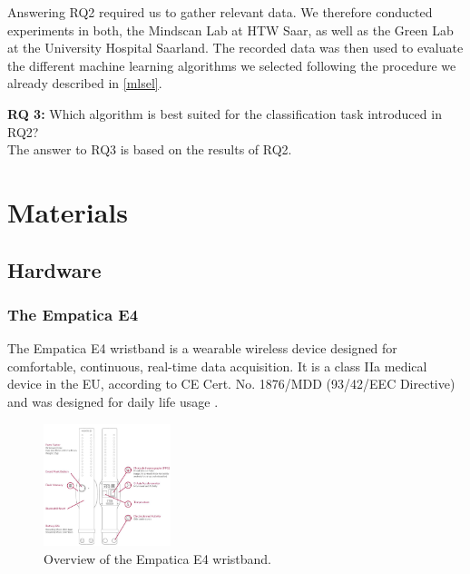 Answering RQ2 required us to gather relevant data. We therefore conducted experiments in both, the Mindscan Lab at HTW Saar, as well as the Green Lab at the University Hospital Saarland. The recorded data was then used to evaluate the different machine learning algorithms we selected following the procedure we already described in \ref{mlsel}. 

\textbf{RQ 3:} Which algorithm is best suited for the classification task introduced in RQ2?\\[10pt]
The answer to RQ3 is based on the results of RQ2.
\section{Materials}

\subsection{Hardware}
\subsubsection{The Empatica E4}
The Empatica E4 wristband is a wearable wireless device designed for comfortable, continuous, real-time data acquisition. It is a class IIa medical device in the EU, according to CE Cert. No. 1876/MDD (93/42/EEC Directive) and was designed for daily life usage \cite{e4}.

\begin{figure}[ht]
	\centering
  \includegraphics[width=0.33\textwidth]{../images/E4overview.JPG}
	\caption{Overview of the Empatica E4 wristband.}
	\label{e4overview}
\end{figure}

